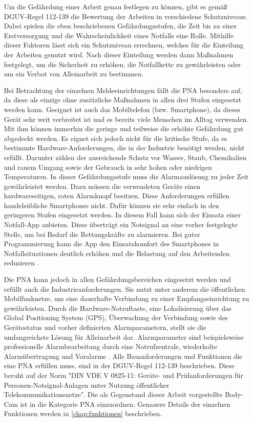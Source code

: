 \documentclass[thesis.tex]{subfiles}
\begin{document}
Um die Gefährdung einer Arbeit genau festlegen zu können, gibt es gemäß DGUV-Regel 112-139 \cite[]{Regel_112-139} die Bewertung der Arbeiten in verschiedene Schutzniveaus.
Dabei spielen die eben beschriebenen Gefährdungsstufen, die Zeit bis zu einer Erstversorgung und die Wahrscheinlichkeit eines Notfalls eine Rolle.
Mithilfe dieser Faktoren lässt sich ein Schutzniveau errechnen, welches für die Einteilung der Arbeiten genutzt wird.
Nach dieser Einteilung werden dann Maßnahmen festgelegt, um die Sicherheit zu erhöhen, die Notfallkette zu gewährleisten oder um ein Verbot von Alleinarbeit zu bestimmen.

Bei Betrachtung der einzelnen Meldeeinrichtungen fällt die PNA besonders auf, da diese als einzige ohne zusätzliche Maßnahmen in allen drei Stufen eingesetzt werden kann.
Geeignet ist auch das Mobiltelefon (bzw. Smartphone), da dieses Gerät sehr weit verbreitet ist und es bereits viele Menschen im Alltag verwenden.
Mit ihm können immerhin die geringe und teilweise die erhöhte Gefährdung gut abgedeckt werden.
Es eignet sich jedoch nicht für die kritische Stufe, da es bestimmte Hardware-Anforderungen, die in der Industrie benötigt werden, nicht erfüllt.
Darunter zählen der ausreichende Schutz vor Wasser, Staub, Chemikalien und rauem Umgang sowie der Gebrauch in sehr hohen oder niedrigen Temperaturen.
In dieser Gefährdungsstufe muss die Alarmauslösung zu jeder Zeit gewährleistet werden.
Dazu müssen die verwendeten Geräte einen hardwareseitigen, roten Alarmknopf besitzen.
Diese Anforderungen erfüllen handelsübliche Smartphones nicht.
Dafür können sie sehr einfach in den geringeren Stufen eingesetzt werden.
In diesem Fall kann sich der Einsatz einer Notfall-App anbieten.
Diese überträgt ein Notsignal an eine vorher festgelegte Stelle, um bei Bedarf die Rettungskräfte zu alarmieren.
Bei guter Programmierung kann die App den Einsatzkomfort des Smartphones in Notfallsituationen deutlich erhöhen und die Belastung auf den Arbeitenden reduzieren \cite[vgl.~S~.2-5]{FAQ-PNAuAPP}.

Die PNA kann jedoch in allen Gefährdungsbereichen eingesetzt werden und erfüllt auch die Industrieanforderungen.
Sie nutzt unter anderem die öffentlichen Mobilfunknetze, um eine dauerhafte Verbindung zu einer Empfangseinrichtung zu gewährleisten.
Durch die Hardware-Notruftaste, eine Lokalisierung über das \glqq Global Positioning System\grqq{} (GPS), Überwachung der Verbindung sowie des Gerätestatus und vorher definierten Alarmparametern, stellt sie die umfangreichste Lösung für Alleinarbeit dar.
Alarmparameter sind beispielsweise professionelle Alarmbearbeitung durch eine Notrufzentrale, wiederholte Alarmübertragung und Voralarme \cite[vgl.~S.~2-5]{FAQ-PNAuAPP}.
Alle Bauanforderungen und Funktionen die eine PNA erfüllen muss, sind in der DGUV-Regel 112-139 \cite[]{Regel_112-139} beschrieben.
Diese beruht auf der Norm "DIN VDE V 0825-11: Geräte- und Prüfanforderungen für Personen-Notsignal-Anlagen unter Nutzung öffentlicher Telekommunikationsnetze".
Die als Gegenstand dieser Arbeit vorgestellte Body-Cam ist in die Kategorie PNA einzuordnen.
Genauere Details der einzelnen Funktionen werden in \autoref{chap:funktionen} beschrieben.
\end{document}
